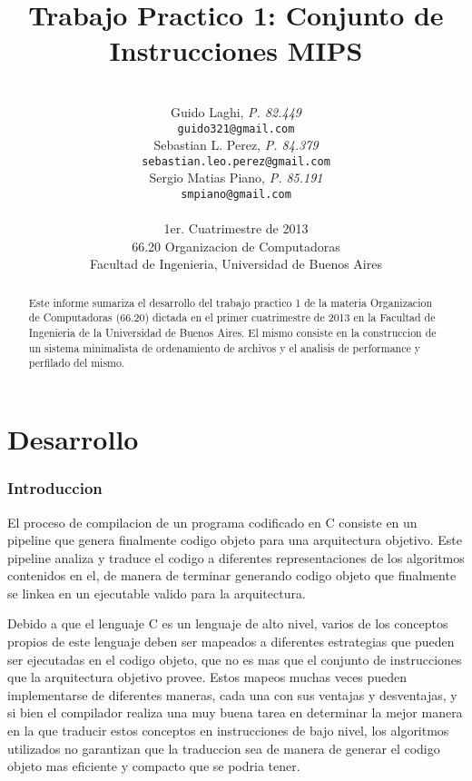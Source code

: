 \documentclass[a4paper,11pt]{article}
\title{\textbf{Trabajo Practico 1: Conjunto de Instrucciones MIPS}}
\author{\\
  Guido Laghi, \textit{P. 82.449}                                  \\
  \texttt{guido321@gmail.com}                                      \\ [2.5ex]
  Sebastian L. Perez, \textit{P. 84.379}                           \\
  \texttt{sebastian.leo.perez@gmail.com}                           \\ [2.5ex]
  Sergio Matias Piano, \textit{P. 85.191}                          \\
  \texttt{smpiano@gmail.com}                                       \\ [2.5ex]
                                                                   \\
  \normalsize{1er. Cuatrimestre de 2013}                           \\
  \normalsize{66.20 Organizacion de Computadoras}                  \\
  \normalsize{Facultad de Ingenieria, Universidad de Buenos Aires} \\
}
\date{}
\begin{document}
\thispagestyle{empty}
\maketitle

\begin{abstract}

  Este informe sumariza el desarrollo del trabajo practico 1 de la materia
  Organizacion de Computadoras (66.20) dictada en el primer cuatrimestre de
  2013 en la Facultad de Ingenieria de la Universidad de Buenos Aires. El mismo
  consiste en la construccion de un sistema minimalista de ordenamiento de
  archivos y el analisis de performance y perfilado del mismo.

\end{abstract}

\clearpage

\tableofcontents
\clearpage


\part{Desarrollo}

\section{Introduccion}

El proceso de compilacion de un programa codificado en C consiste en un
pipeline que genera finalmente codigo objeto para una arquitectura objetivo.
Este pipeline analiza y traduce el codigo a diferentes representaciones de los
algoritmos contenidos en el, de manera de terminar generando codigo objeto que
finalmente se linkea en un ejecutable valido para la arquitectura.

Debido a que el lenguaje C es un lenguaje de alto nivel, varios de los
conceptos propios de este lenguaje deben ser mapeados a diferentes estrategias
que pueden ser ejecutadas en el codigo objeto, que no es mas que el conjunto de
instrucciones que la arquitectura objetivo provee. Estos mapeos muchas veces
pueden implementarse de diferentes maneras, cada una con sus ventajas y
desventajas, y si bien el compilador realiza una muy buena tarea en determinar
la mejor manera en la que traducir estos conceptos en instrucciones de bajo
nivel, los algoritmos utilizados no garantizan que la traduccion sea de manera
de generar el codigo objeto mas eficiente y compacto que se podria tener.
\end{document}
